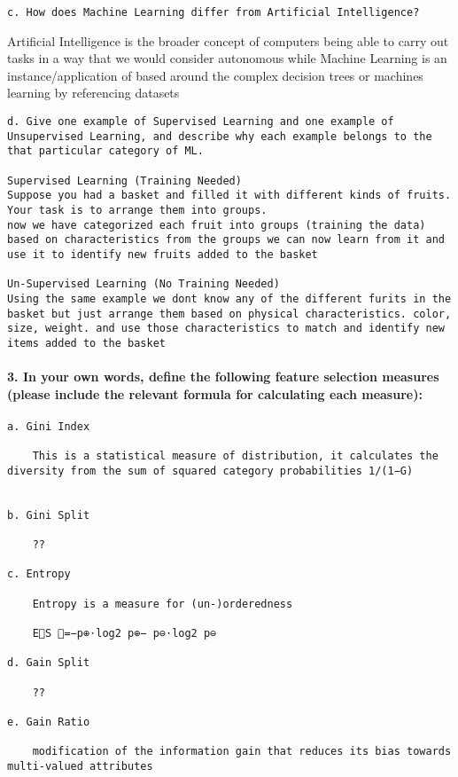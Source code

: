 \documentclass[11pt]{article}
\begin{document}
\begin{verbatim}
c. How does Machine Learning differ from Artificial Intelligence?
\end{verbatim}

Artificial Intelligence is the broader concept of computers being able
to carry out tasks in a way that we would consider autonomous while
Machine Learning is an instance/application of based around the complex
decision trees or machines learning by referencing datasets

\begin{verbatim}
d. Give one example of Supervised Learning and one example of Unsupervised Learning, and describe why each example belongs to the that particular category of ML. 

Supervised Learning (Training Needed)
Suppose you had a basket and filled it with different kinds of fruits. Your task is to arrange them into groups. 
now we have categorized each fruit into groups (training the data) based on characteristics from the groups we can now learn from it and use it to identify new fruits added to the basket

Un-Supervised Learning (No Training Needed)
Using the same example we dont know any of the different furits in the basket but just arrange them based on physical characteristics. color, size, weight. and use those characteristics to match and identify new items added to the basket
\end{verbatim}

\paragraph{3. In your own words, define the following feature selection
measures (please include the relevant formula for calculating each
measure):}\label{in-your-own-words-define-the-following-feature-selection-measures-please-include-the-relevant-formula-for-calculating-each-measure}

\begin{verbatim}
a. Gini Index

    This is a statistical measure of distribution, it calculates the diversity from the sum of squared category probabilities 1/(1−G)


b. Gini Split

    ??

c. Entropy
    
    Entropy is a measure for (un-)orderedness
    
    ES =−p⊕⋅log2 p⊕− p⊖⋅log2 p⊖
    
d. Gain Split

    ??
    
e. Gain Ratio

    modification of the information gain that reduces its bias towards multi-valued attributes
\end{verbatim}
\end{document}

